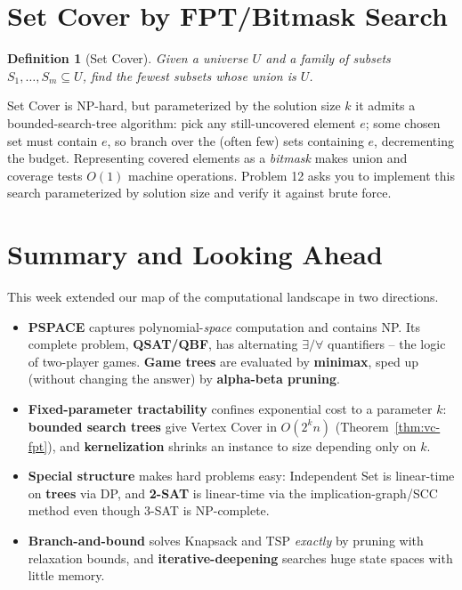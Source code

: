 \documentclass[11pt]{article}
\newtheorem{definition}[theorem]{Definition}
\begin{document}
\section{Set Cover by FPT/Bitmask Search}

\begin{definition}[Set Cover]
Given a universe $U$ and a family of subsets $S_1,\dots,S_m \subseteq U$, find
the fewest subsets whose union is $U$.
\end{definition}

Set Cover is NP-hard, but parameterized by the solution size $k$ it admits a
bounded-search-tree algorithm: pick any still-uncovered element $e$; some chosen
set must contain $e$, so branch over the (often few) sets containing $e$,
decrementing the budget. Representing covered elements as a \emph{bitmask}
makes union and coverage tests $O(1)$ machine operations. Problem 12 asks you
to implement this search parameterized by solution size and verify it against
brute force.

\section{Summary and Looking Ahead}

This week extended our map of the computational landscape in two directions.

\begin{itemize}
    \item \textbf{PSPACE} captures polynomial-\emph{space} computation and
    contains NP. Its complete problem, \textbf{QSAT/QBF}, has alternating
    $\exists/\forall$ quantifiers -- the logic of two-player games. \textbf{Game
    trees} are evaluated by \textbf{minimax}, sped up (without changing the
    answer) by \textbf{alpha-beta pruning}.

    \item \textbf{Fixed-parameter tractability} confines exponential cost to a
    parameter $k$: \textbf{bounded search trees} give Vertex Cover in
    $O(2^k n)$ (Theorem~\ref{thm:vc-fpt}), and \textbf{kernelization} shrinks an
    instance to size depending only on $k$.

    \item \textbf{Special structure} makes hard problems easy: Independent Set
    is linear-time on \textbf{trees} via DP, and \textbf{2-SAT} is linear-time
    via the implication-graph/SCC method even though 3-SAT is NP-complete.

    \item \textbf{Branch-and-bound} solves Knapsack and TSP \emph{exactly} by
    pruning with relaxation bounds, and \textbf{iterative-deepening} searches
    huge state spaces with little memory.
\end{itemize}
\end{document}
